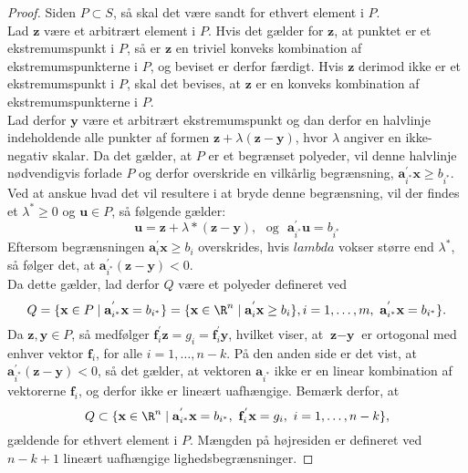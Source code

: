 \begin{proof}
Siden $P \subset S$, så skal det være sandt for ethvert element i $P$. \\
Lad $\textbf{z}$ være et arbitrært element i $P$. 
Hvis det gælder for $\textbf{z}$, at punktet er et ekstremumspunkt i $P$, så er $\textbf{z}$ en triviel konveks kombination af ekstremumspunkterne i $P$, og beviset er derfor færdigt. 
Hvis $\textbf{z}$ derimod ikke er et ekstremumspunkt i $P$, skal det bevises, at $\textbf{z}$ er en konveks kombination af ekstremumspunkterne i $P$. \\
Lad derfor $\textbf{y}$ være et arbitrært ekstremumspunkt og dan derfor en halvlinje indeholdende alle punkter af formen $\textbf{z}+\lambda(\textbf{z}-\textbf{y})$, hvor $\lambda$ angiver en ikke-negativ skalar. 
Da det gælder, at $P$ er et begrænset polyeder, vil denne halvlinje nødvendigvis forlade $P$ og derfor overskride en vilkårlig begrænsning, $\mathbf{a}_{i^*}^{'} \textbf{x} \geq b_{i^*}$. 
Ved at anskue hvad det vil resultere i at bryde denne begrænsning, vil der findes et $\lambda^* \geq 0$ og $\textbf{u} \in P$, så følgende gælder: \\ 
$$\textbf{u}=\textbf{z}+\lambda*(\textbf{z}-\textbf{y}), \text{     } \text{og} \text{      } \mathbf{a}_{i^*}^{'} \textbf{u} = b_{i^*} $$
Eftersom begrænsningen $\mathbf{a}_{i}^{'} \textbf{x} \geq b_i$ overskrides, hvis $lambda$ vokser større end $\lambda^*$, så følger det, at $\mathbf{a}_{i^*}^{'}(\textbf{z}-\textbf{y}) <0.$ \\
Da dette gælder, lad derfor $Q$ være et polyeder defineret ved 
$$Q=\{\textbf{x} \in P \mid \mathbf{a}_{i^*}^{'} \textbf{x} =b_{i^*}\} = \{\textbf{x} \in \R^n \mid \mathbf{a}_{i}^{'} \textbf{x} \geq b_{i}\}, i=1,\ldots,m, \text{   } \mathbf{a}_{i^*}^{'} \textbf{x} =b_{i^*}\}.$$
Da $\textbf{z},\textbf{y} \in P$, så medfølger $\mathbf{f}_{i}^{'}\textbf{z}=g_i=\mathbf{f}_{i}^{'}\textbf{y}$, hvilket viser, at $\textbf{z}-\textbf{y}$ er ortogonal med enhver vektor $\mathbf{f}_{i}$, for alle $i=1,\ldots,n-k$. 
På den anden side er det vist, at $\mathbf{a}_{i^*}^{'}(\textbf{z}-\textbf{y}) <0$, så det gælder, at vektoren  $\mathbf{a}_{i^*}$ ikke er en linear kombination af vektorerne $\mathbf{f}_{i}$, og derfor ikke er lineært uafhængige. 
Bemærk derfor, at \\
$$Q \subset \{\textbf{x} \in \R^n \mid \mathbf{a}_{i^*}^{'} \textbf{x}=b_{i^*}, \text{  } \mathbf{f}_{i}^{'}\textbf{x}=g_i, \text{  } i=1,\ldots,n-k\},$$ 
gældende for ethvert element i $P$. 
Mængden på højresiden er defineret ved $n-k+1$ lineært uafhængige lighedsbegrænsninger. 

\end{proof}
